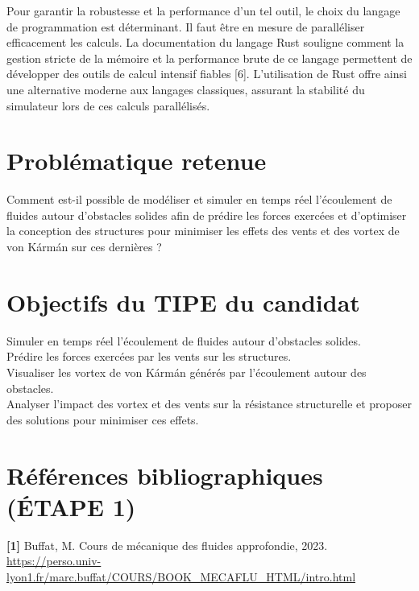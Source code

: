 \documentclass{article}
\begin{document}
Pour garantir la robustesse et la performance d'un tel outil, le choix du langage de 
programmation est déterminant. Il faut être en mesure de paralléliser efficacement les calculs. 
La documentation du langage Rust souligne comment la gestion stricte de la mémoire et la performance 
brute de ce langage permettent de développer des outils de calcul intensif fiables [6]. L'utilisation 
de Rust offre ainsi une alternative moderne aux langages classiques, assurant la stabilité du 
simulateur lors de ces calculs parallélisés.\\

  
\section*{Problématique retenue}


Comment est-il possible de modéliser et simuler en temps réel l'écoulement de fluides autour 
d'obstacles solides   afin de prédire les forces exercées et d'optimiser la conception des structures pour minimiser
les effets des vents et des vortex de von Kármán sur ces dernières ?\\



\section*{Objectifs du TIPE du candidat}

Simuler en temps réel l'écoulement de fluides autour d'obstacles solides.\\

Prédire les forces exercées par les vents sur les structures.\\

Visualiser les vortex de von Kármán générés par l'écoulement autour des obstacles.\\

Analyser l'impact des vortex et des vents sur la résistance structurelle et proposer des solutions pour minimiser ces effets.\\





\section*{Références bibliographiques (ÉTAPE 1)}

\textbf{[1]} Buffat, M. Cours de mécanique des fluides approfondie, 2023. \url{https://perso.univ-lyon1.fr/marc.buffat/COURS/BOOK_MECAFLU_HTML/intro.html}\\
\end{document}
